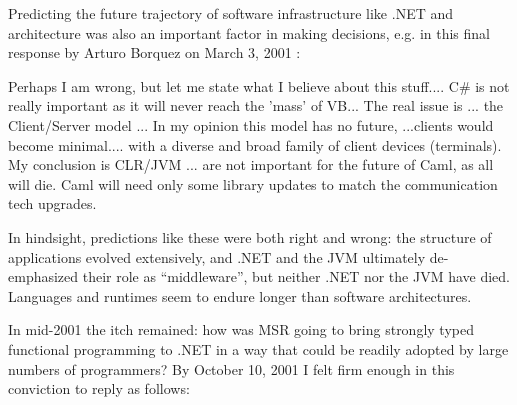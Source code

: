 \documentclass[acmsmall,screen]{acmart}
\begin{document}
Predicting the future trajectory of software infrastructure like .NET and architecture was also an important factor in making decisions, e.g. in this final response by Arturo Borquez on March 3, 2001 \citep{RefCamlArchive7}:
\begin{verbquote}
Perhaps I am wrong, but let me state what I believe about this stuff.... C\# is not really important as it will never reach the 'mass' of VB... The real issue is ... the Client/Server model ... In my opinion this model has no future, ...clients would become minimal.... with a diverse and broad family of client devices (terminals). My conclusion is CLR/JVM ... are not important for the future of Caml, as all will die. Caml will need only some library updates to match the communication tech upgrades.  
\end{verbquote}
In hindsight, predictions like these were both right and wrong: the structure of applications evolved extensively, and .NET and the JVM ultimately de-emphasized their role as “middleware”, but neither .NET nor the JVM have died.  Languages and runtimes seem to endure longer than software architectures.

In mid-2001 the itch remained: how was MSR going to bring strongly typed functional programming to .NET in a way that could be readily adopted by large numbers of programmers?  By October 10, 2001 I felt firm enough in this conviction to reply as follows:
\end{document}
